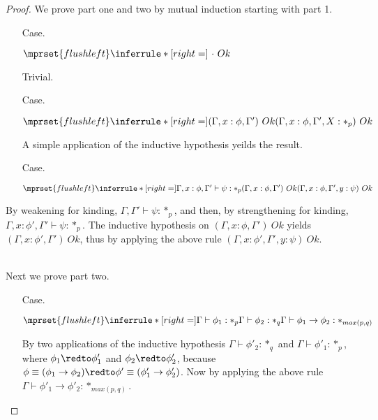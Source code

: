 \begin{proof}
  We prove part one and two by mutual induction starting with part 1.
\begin{itemize}
\item[Case.] \ \\
  \begin{center}
    \begin{math}
      $$\mprset{flushleft}
      \inferrule* [right=] {
        \   
      }{\cdot\ Ok}
    \end{math}
  \end{center}
  Trivial.

\item[Case.]\ \\
  \begin{center}
    \begin{math}
      $$\mprset{flushleft}
      \inferrule* [right=] {
        (\Gamma,x:\phi,\Gamma')\ Ok
      }{(\Gamma,x:\phi,\Gamma',X:*_p)\ Ok}
    \end{math}
  \end{center}
  A simple application of the inductive hypothesis yeilds the result.

\item[Case.]\ \\
  \begin{center}
    \begin{math}
      $$\mprset{flushleft}
      \inferrule* [right=] {
        \Gamma,x:\phi,\Gamma' \vdash \psi:*_p
        \\
        (\Gamma,x:\phi,\Gamma')\ Ok
      }{(\Gamma,x :\phi,\Gamma',y:\psi)\ Ok}
    \end{math} 
  \end{center}
\end{itemize}
By weakening for kinding, $\Gamma,\Gamma' \vdash \psi:*_p$, and then, by strengthening for kinding, $\Gamma,x:\phi',\Gamma' \vdash \psi:*_p$.
The inductive hypothesis on $(\Gamma,x:\phi,\Gamma')\ Ok$ yields $(\Gamma,x:\phi',\Gamma')\ Ok$, thus by applying the above rule
$(\Gamma,x :\phi',\Gamma',y:\psi)\ Ok$.

\ \\
\noindent
Next we prove part two.
\begin{itemize}
\item[Case.] \ \\
  \begin{center}
    \begin{math}
      $$\mprset{flushleft}
      \inferrule* [right=] {
        \Gamma \vdash \phi_1 : *_p
        \\
        \Gamma \vdash \phi_2 : *_q
      }{\Gamma \vdash \phi_1 \rightarrow \phi_2 : *_{max(p,q)}}
    \end{math}
  \end{center}
  By two applications of the inductive hypothesis $\Gamma \vdash \phi'_2 : *_q$ and
  $\Gamma \vdash \phi'_1 : *_p$, where $\phi_1 \redto \phi'_1$ and $\phi_2 \redto \phi'_2$, because
  $\phi \equiv (\phi_1 \to \phi_2) \redto \phi' \equiv (\phi'_1 \to \phi'_2)$.  Now by applying
  the above rule $\Gamma \vdash \phi'_1 \to \phi'_2 : *_{max(p,q)}$. 


\end{itemize}
\end{proof}
